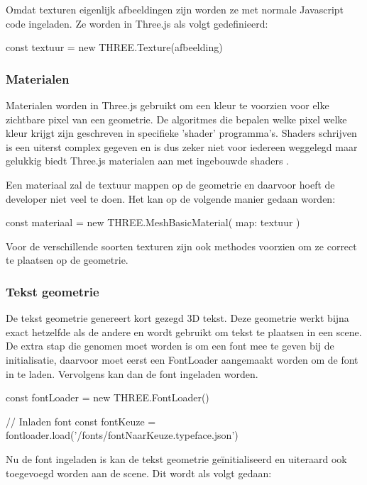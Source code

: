 Omdat texturen eigenlijk afbeeldingen zijn worden ze met normale Javascript code ingeladen. Ze worden in Three.js als volgt gedefinieerd:

\begin{LVerbatim}
const textuur = new THREE.Texture(afbeelding)
\end{LVerbatim}

\subsubsection{Materialen}

Materialen worden in Three.js gebruikt om een kleur te voorzien voor elke zichtbare pixel van een geometrie. De algoritmes die bepalen welke pixel welke kleur krijgt zijn geschreven in specifieke 'shader' programma's. Shaders schrijven is een uiterst complex gegeven en is dus zeker niet voor iedereen weggelegd maar gelukkig biedt Three.js materialen aan met ingebouwde shaders \autocite{Simon2023}.

Een materiaal zal de textuur mappen op de geometrie en daarvoor hoeft de developer niet veel te doen. Het kan op de volgende manier gedaan worden:

\begin{LVerbatim}
const materiaal = new THREE.MeshBasicMaterial({ map: textuur })
\end{LVerbatim}

Voor de verschillende soorten texturen zijn ook methodes voorzien om ze correct te plaatsen op de geometrie.

\subsubsection{Tekst geometrie}

De tekst geometrie genereert kort gezegd 3D tekst. Deze geometrie werkt bijna exact hetzelfde als de andere en wordt gebruikt om tekst te plaatsen in een scene. De extra stap die genomen moet worden is om een font mee te geven bij de initialisatie, daarvoor moet eerst een FontLoader aangemaakt worden om de font in te laden. Vervolgens kan dan de font ingeladen worden.

\begin{LVerbatim}
const fontLoader = new THREE.FontLoader()

// Inladen font
const fontKeuze = fontloader.load('/fonts/fontNaarKeuze.typeface.json')
\end{LVerbatim}

Nu de font ingeladen is kan de tekst geometrie geïnitialiseerd en uiteraard ook toegevoegd worden aan de scene. Dit wordt als volgt gedaan:

